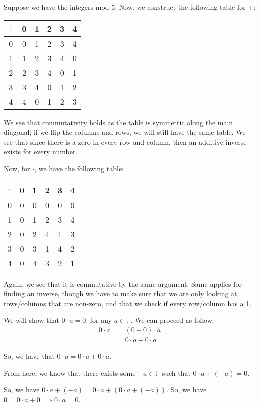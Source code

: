 \documentclass[openany]{book}
\begin{document}
	\begin{example}
		Suppose we have the integers mod 5. Now, we construct the following table for $+$:
		\begin{center}
			\begin{tabular}{c | c c c c c}
				$+$ & 0 & 1 & 2 & 3 & 4 \\
				\hline
				0 & 0 & 1 & 2 & 3 & 4 \\
				1 & 1 & 2 & 3 & 4 & 0 \\
				2 & 2 & 3 & 4 & 0 & 1 \\
				3 & 3 & 4 & 0 & 1 & 2 \\
				4 & 4 & 0 & 1 & 2 & 3
			\end{tabular}
		\end{center}
		
		We see that commutativity holds as the table is symmetric along the main diagonal; if we flip the columns and rows, we will still have the same table. We see that since there is a zero in every row and column, then an additive inverse exists for every number.
		
		Now, for $\cdot$, we have the following table:
		\begin{center}
			\begin{tabular}{c | c c c c c}
				$\cdot$ & 0 & 1 & 2 & 3 & 4 \\
				\hline
				0 & 0 & 0 & 0 & 0 & 0 \\
				1 & 0 & 1 & 2 & 3 & 4 \\
				2 & 0 & 2 & 4 & 1 & 3 \\
				3 & 0 & 3 & 1 & 4 & 2 \\
				4 & 0 & 4 & 3 & 2 & 1
			\end{tabular}
		\end{center}
		
		Again, we see that it is commutative by the same argument. Same applies for finding an inverse, though we have to make sure that we are only looking at rows/columns that are non-zero, and that we check if every row/column has a 1.
	\end{example}
	
	\begin{rmk}[$0 \cdot a = 0$]
		We will show that $0 \cdot a = 0$, for any $a \in \mathbb{F}$. We can proceed as follow:
		\begin{align*}
			0 \cdot a &= (0 + 0) \cdot a \\
			&= 0 \cdot a + 0 \cdot a
		\end{align*}
		
		So, we have that $0 \cdot a = 0 \cdot a + 0 \cdot a$.
		
		From here, we know that there exists some $-a \in \mathbb{F}$ such that $0 \cdot a  + (-a) = 0$. 
		
		So, we have $0 \cdot a + (-a) = 0 \cdot a + (0 \cdot a + (-a))$. So, we have $0 = 0 \cdot a + 0 \implies 0 \cdot a = 0$. 
	\end{rmk}
	
\end{document}
